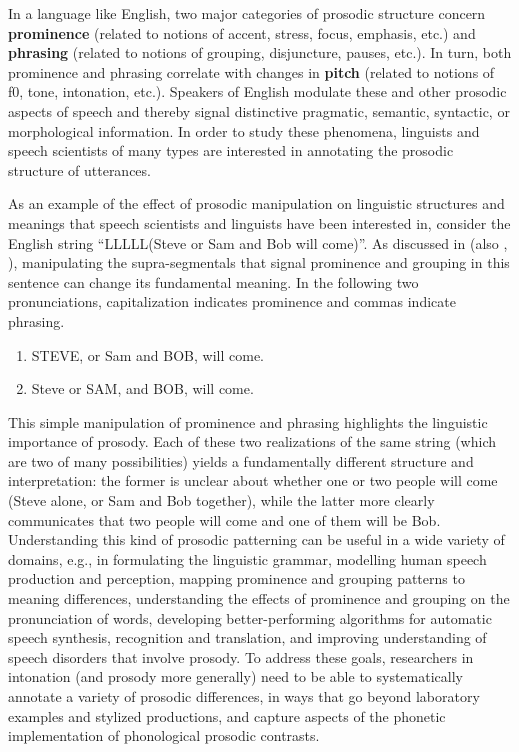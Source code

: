 \documentclass[11pt, twoside]{memoir}
\begin{document}
In a language like English, two major categories of prosodic structure concern \textbf{prominence} (related to notions of accent, stress, focus, emphasis, etc.) and \textbf{phrasing} (related to notions of grouping, disjuncture, pauses, etc.). In turn, both prominence and phrasing correlate with changes in \textbf{pitch} (related to notions of f0, tone, intonation, etc.). Speakers of English modulate these and other prosodic aspects of speech and thereby signal distinctive pragmatic, semantic, syntactic, or morphological information. In order to study these phenomena, linguists and speech scientists of many types are interested in annotating the prosodic structure of utterances.

As an example of the effect of prosodic manipulation on linguistic structures and meanings that speech scientists and linguists have been interested in, consider the English string “LLLLL(Steve or Sam and Bob will come)”. As discussed in \citealt{lehiste73} (also \citealt{price-91}, \citealt{veilleux-06}), manipulating the supra-segmentals that signal prominence and grouping in this sentence can change its fundamental meaning. In the following two pronunciations, capitalization indicates prominence and commas indicate phrasing.

\begin{enumerate} \def\labelenumi{\arabic{enumi}.}
\item STEVE, or Sam and BOB, will come.
\item Steve or SAM, and BOB, will come. \end{enumerate}

This simple manipulation of prominence and phrasing highlights the linguistic importance of prosody. Each of these two realizations of the same string (which are two of many possibilities) yields a fundamentally different structure and interpretation: the former is unclear about whether one or two people will come (Steve alone, or Sam and Bob together), while the latter more clearly communicates that two people will come and one of them will be Bob. Understanding this kind of prosodic patterning can be useful in a wide variety of domains, e.g., in formulating the linguistic grammar, modelling human speech production and perception, mapping prominence and grouping patterns to meaning differences, understanding the effects of prominence and grouping on the pronunciation of words, developing better-performing algorithms for automatic speech synthesis, recognition and translation, and improving understanding of speech disorders that involve prosody. To address these goals, researchers in intonation (and prosody more generally) need to be able to systematically annotate a variety of prosodic differences, in ways that go beyond laboratory examples and stylized productions, and capture aspects of the phonetic implementation of phonological prosodic contrasts.
\end{document}
